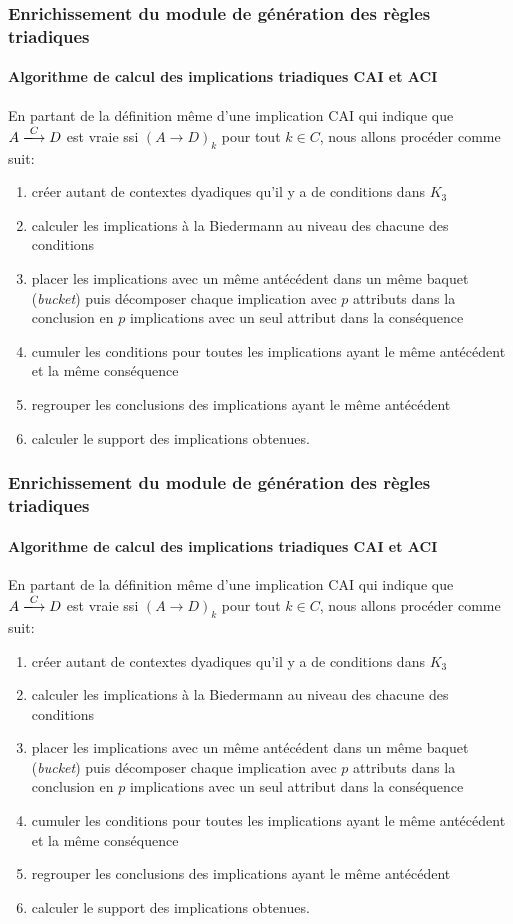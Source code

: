 \documentclass[french]{beamer}
\newcommand{\lm}{\emph{Lattice Miner}\xspace}
\begin{document}
\begin{frame}
\frametitle{Enrichissement du module de génération des règles triadiques}
\framesubtitle{Algorithme de calcul des implications triadiques CAI et ACI}
En partant de la définition même d'une implication CAI qui indique que $A \xlongrightarrow{C} D$ est vraie ssi $(A \rightarrow D)_k$ pour tout $k \in C$, nous allons procéder comme suit:
\begin{enumerate}
	\item créer autant de contextes dyadiques qu'il y a de conditions dans $K_3$
	\item calculer les implications à la Biedermann au niveau des chacune des conditions
	\item placer les implications avec un même antécédent dans un même baquet (\emph{bucket}) puis décomposer chaque implication avec $p$ attributs dans la conclusion en $p$ implications avec un seul attribut dans la conséquence 
	\item cumuler les conditions pour toutes les implications ayant le même antécédent et la même conséquence
	\item regrouper les conclusions des implications ayant le même antécédent
	\item calculer le support des implications obtenues.		
\end{enumerate}
\end{frame}
\begin{frame}
\frametitle{Enrichissement du module de génération des règles triadiques}
\framesubtitle{Algorithme de calcul des implications triadiques CAI et ACI}
En partant de la définition même d'une implication CAI qui indique que $A \xlongrightarrow{C} D$ est vraie ssi $(A \rightarrow D)_k$ pour tout $k \in C$, nous allons procéder comme suit:
\begin{enumerate}
	\item créer autant de contextes dyadiques qu'il y a de conditions dans $K_3$
	\item calculer les implications à la Biedermann au niveau des chacune des conditions
	\item placer les implications avec un même antécédent dans un même baquet (\emph{bucket}) puis décomposer chaque implication avec $p$ attributs dans la conclusion en $p$ implications avec un seul attribut dans la conséquence 
	\item cumuler les conditions pour toutes les implications ayant le même antécédent et la même conséquence
	\item regrouper les conclusions des implications ayant le même antécédent
	\item calculer le support des implications obtenues.		
\end{enumerate}
\end{frame}
\end{document}
